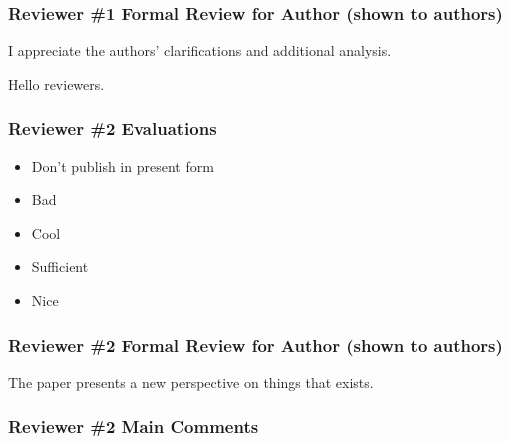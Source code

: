 \documentclass{reviewresponse}
\begin{document}
\subsubsection*{Reviewer \#1 Formal Review for Author (shown to authors)}

{
  \begin{generalcomment}
    I appreciate the authors' clarifications and additional analysis.
  \end{generalcomment}
  \begin{revresponse}[Hi]
    Hello reviewers.
  \end{revresponse}
}

\reviewer

\subsubsection*{Reviewer \#2 Evaluations}

\begin{evaluation}
  \begin{itemize}[leftmargin=4.5cm,noitemsep]
    \item
      [\textbf{Recommendation}] Don't publish in present form
    \item
      [\textbf{Referencing}] Bad
    \item
      [\textbf{Quality}] Cool
    \item
      [\textbf{Data}] Sufficient
    \item
      [\textbf{Accurate Key Points}] Nice
  \end{itemize}
\end{evaluation}

\subsubsection*{Reviewer \#2 Formal Review for Author (shown to authors)}
\begin{generalcomment}
  The paper presents a new perspective on things that exists.
\end{generalcomment}

\subsubsection*{Reviewer \#2 Main Comments}
\end{document}
